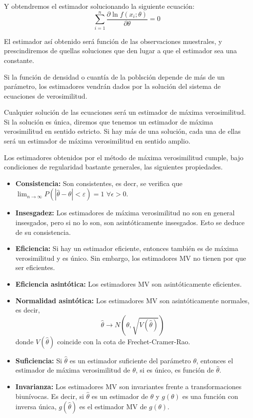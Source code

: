 Y obtendremos el estimador solucionando la siguiente ecuaci\'on:
\begin{equation*}
\sum_{i=1}^n\dfrac{\partial\ln{f(x_i;\theta)}}{\partial\theta}=0
\end{equation*}

El estimador as\'i obtenido ser\'a funci\'on de las observaciones muestrales, y prescindiremos de quellas soluciones que den lugar a que el estimador sea una constante.

Si la funci\'on de densidad o cuant\'ia de la poblsci\'on depende de m\'as de un par\'ametro, los estimadores vendr\'an dados por la soluci\'on del sistema de ecuaciones de verosimilitud.

Cualquier soluci\'on de las ecuaciones ser\'a un estimador de m\'axima verosimilitud. Si la soluci\'on es \'unica, diremos que tenemos un estimador de m\'axima verosimilitud en sentido estricto. Si hay m\'as de una soluci\'on, cada una de ellas ser\'a un estimador de m\'axima verosimilitud en sentido amplio.


Los estimadores obtenidos por el m\'etodo de m\'axima verosimilitud cumple, bajo condiciones de regularidad bastante generales, las siguientes propiedades.

\begin{itemize}
\item \textbf{Consistencia:} Son consistentes, es decr, se verifica que $\lim_{n\to\infty}P(|\hat{\theta}-\theta|<\varepsilon)=1$ $\forall\epsilon>0$.
\item \textbf{Insesgadez:} Los estimadores de m\'axima verosimilitud no son en general insesgados, pero si no lo son, son asint\'oticamente insesgados. Esto se deduce de su consistencia.
\item \textbf{Eficiencia:} Si hay un estimador eficiente, entonces tambi\'en es de m\'axima verosimilitud y es \'unico. Sin embargo, los estimadores MV no tienen por que ser eficientes.
\item \textbf{Eficiencia asint\'otica:} Los estimadores MV son asint\'oticamente eficientes.
\item \textbf{Normalidad asint\'otica:} Los estimadores MV son asint\'oticamente normales, es decir,
\begin{equation*}
\hat{\theta}\to N(\theta, \sqrt{V(\hat{\theta})})
\end{equation*}
donde $V(\hat{\theta})$ coincide con la cota de Frechet-Cramer-Rao.
\item \textbf{Suficiencia:} Si $\hat{\theta}$ es un estimador suficiente del par\'ametro $\theta$, entonces el estimador de m\'axima verosimilitud de $\theta$, si es \'unico, es funci\'on de $\hat{\theta}$.
\item \textbf{Invarianza:} Los estimadores MV son invariantes frente a transformaciones biun\'ivocas. Es decir, si $\hat{\theta}$ es un estimador de $\theta$ y $g(\theta)$ es una funci\'on con inversa \'unica, $g(\hat{\theta})$ es el estimador MV de $g(\theta)$.
\end{itemize}